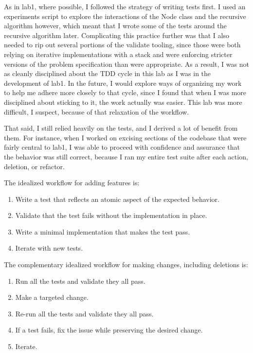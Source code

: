 \documentclass[10pt,letterpaper,final]{report}
\begin{document}
As in lab1, where possible, I followed the strategy of writing tests first. I used an experiments script to explore the interactions of the Node class and the recursive algorithm however, which meant that I wrote some of the tests around the recursive algorithm later. Complicating this practice further was that I also needed to rip out several portions of the validate tooling, since those were both relying on iterative implementations with a stack and were enforcing stricter versions of the problem specification than were appropriate. As a result, I was not as cleanly disciplined about the TDD cycle in this lab as I was in the development of lab1. In the future, I would explore ways of organizing my work to help me adhere more closely to that cycle, since I found that when I was more disciplined about sticking to it, the work actually was easier. This lab was more difficult, I suspect, because of that relaxation of the workflow.

That said, I still relied heavily on the tests, and I derived a lot of benefit from them. For instance, when I worked on excising sections of the codebase that were fairly central to lab1, I was able to proceed with confidence and assurance that the behavior was still correct, because I ran my entire test suite after each action, deletion, or refactor.


\noindent The idealized workflow for adding features is:

\begin{enumerate}
  \item Write a test that reflects an atomic aspect of the expected behavior.
  \item Validate that the test fails without the implementation in place.
  \item Write a minimal implementation that makes the test pass.
  \item Iterate with new tests.
\end{enumerate}

\noindent The complementary idealized workflow for making changes, including deletions is:

\begin{enumerate}
  \item Run all the tests and validate they all pass.
  \item Make a targeted change.
  \item Re-run all the tests and validate they all pass.
  \item If a test fails, fix the issue while preserving the desired change.
  \item Iterate.
\end{enumerate}
\end{document}

